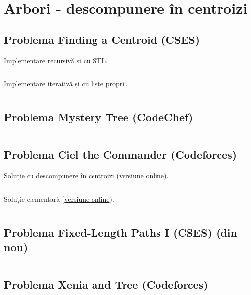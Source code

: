 \documentclass[../main.tex]{subfiles}
\begin{document}
\chapter{Arbori - descompunere în centroizi}

\section{Problema Finding a Centroid (CSES)}
\label{code:finding-a-centroid}

Implementare recursivă și cu STL.

\inputminted{cpp}{../src/trees/finding-a-centroid-rec.cpp}

Implementare iterativă și cu liste proprii.

\inputminted{cpp}{../src/trees/finding-a-centroid-iter.cpp}

\section{Problema Mystery Tree (CodeChef)}
\label{code:mystery-tree}

\inputminted{cpp}{../src/trees/mystery-tree.cpp}

\section{Problema Ciel the Commander (Codeforces)}
\label{code:ciel-the-commander}

Soluție cu descompunere în centroizi (\href{https://codeforces.com/contest/321/submission/304671975}{versiune online}).

\inputminted{cpp}{../src/trees/ciel-the-commander-centroid-decomp.cpp}

Soluție elementară (\href{https://codeforces.com/contest/321/submission/235254636}{versiune online}).

\inputminted{cpp}{../src/trees/ciel-the-commander-bit-masks.cpp}

\section{Problema Fixed-Length Paths I (CSES) (din nou)}
\label{code:fixed-length-paths-1-centroid}

\inputminted{cpp}{../src/trees/fixed-length-paths-1-centroid.cpp}

\section{Problema Xenia and Tree (Codeforces)}
\label{code:xenia-and-tree}
\end{document}
